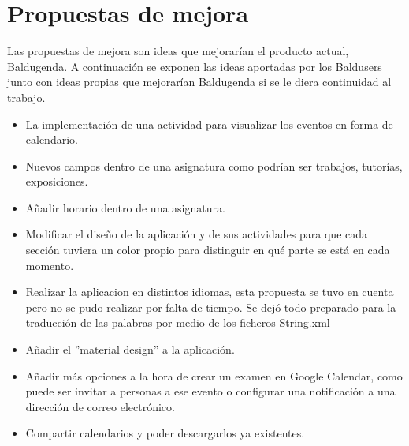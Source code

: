 \section{Propuestas de mejora}

Las propuestas de mejora son ideas que mejorarían el producto actual, Baldugenda.
A continuación se exponen las ideas aportadas por los Baldusers junto con ideas propias que mejorarían Baldugenda si se le diera continuidad al trabajo. 
\begin{itemize}
	\item La implementación de una actividad para visualizar los eventos en forma de calendario.
	\item Nuevos campos dentro de una asignatura como podrían ser trabajos, tutorías, exposiciones.
	\item Añadir horario dentro de una asignatura.
	\item Modificar el diseño de la aplicación y de sus actividades para que cada sección tuviera un color propio para distinguir en qué parte se está en cada momento.
	\item Realizar la aplicacion en distintos idiomas, esta propuesta se tuvo en cuenta pero no se pudo realizar por falta de tiempo. Se dejó todo preparado para la traducción de las palabras por medio de los ficheros String.xml
	\item Añadir el ''material design'' a la aplicación.
	\item Añadir más opciones a la hora de crear un examen en Google Calendar, como puede ser invitar a personas a ese evento o configurar una notificación a una dirección de correo electrónico.
	\item Compartir calendarios y poder descargarlos ya existentes.
\end{itemize}